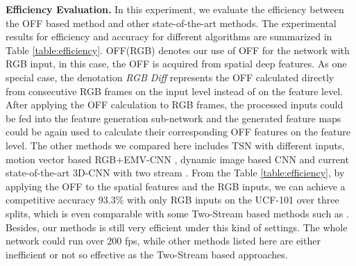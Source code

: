 \documentclass[10pt,twocolumn,letterpaper]{article}
\begin{document}
\textbf{Efficiency Evaluation.} In this experiment, we evaluate the efficiency between the OFF based method and other state-of-the-art methods. The experimental results for efficiency and accuracy for different algorithms are summarized in Table \ref{table:efficiency}. OFF(RGB) denotes our use of OFF for the network with RGB input, in this case, the OFF is acquired from spatial deep features. As one special case, the denotation \textit{RGB Diff} represents the OFF calculated directly from consecutive RGB frames on the input level instead of on the feature level. After applying the OFF calculation to RGB frames, the processed inputs could be fed into the feature generation sub-network and the generated feature maps could be again used to calculate their corresponding OFF features on the feature level.
The other methods we compared here includes TSN \cite{wang2016tsn} with different inputs, motion vector based RGB+EMV-CNN \cite{zhang2016motionvector}, dynamic image based CNN \cite{bilen2016dynamic} and current state-of-the-art 3D-CNN with two stream \cite{carreira2017i3d}.
From the Table \ref{table:efficiency}, by applying the OFF to the spatial features and the RGB inputs, we can achieve a competitive accuracy $93.3\%$ with only RGB inputs on the UCF-101 over three splits, which is even comparable with some Two-Stream based methods such as \cite{carreira2017i3d,wang2016tsn}. Besides, our methods is still very efficient under this kind of settings. The whole network could run over 200 fps, while other methods listed here are either inefficient or not so effective as the Two-Stream based approaches.
\end{document}
